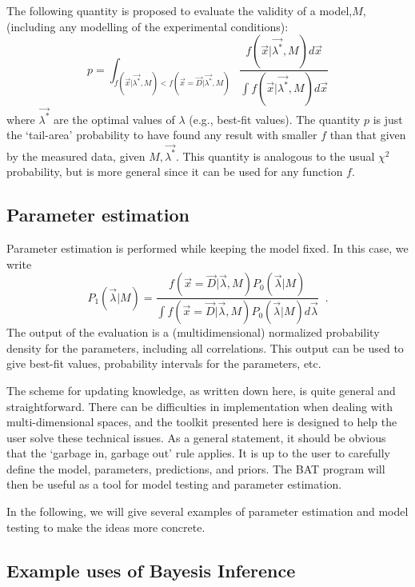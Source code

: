 \documentclass[11pt, a4paper]{article}
\begin{document}
The following quantity is proposed to evaluate the validity of a
model,$M$, (including any modelling of the experimental conditions):
%
\begin{equation}
p=\int_{f(\vec{x}|\vec{\lambda^*},M)<f(\vec{x}=\vec{D}|\vec{\lambda^*},M)} \frac{f(\vec{x}|\vec{\lambda^*},M) d\vec{x}}{\int f(\vec{x}|\vec{\lambda^*},M) d\vec{x}}
\end{equation}
%
where $\vec{\lambda^*}$ are the optimal values of $\lambda$ (e.g.,
best-fit values). The quantity $p$ is just the `tail-area' probability
to have found any result with smaller $f$ than that given by the
measured data, given $M,\vec{\lambda^*}$.  This quantity is analogous
to the usual $\chi^2$ probability, but is more general since it can be
used for any function $f$.

\subsection{Parameter estimation}
%
Parameter estimation is performed while keeping the model fixed.  In
this case, we write
%
\begin{equation}
P_{1}(\vec{\lambda}|M) =\frac{f(\vec{x}=\vec{D}|\vec{\lambda},M) P_{0}(\vec{\lambda}|M)}
{\int f(\vec{x}=\vec{D}|\vec{\lambda},M) P_{0}(\vec{\lambda}|M) d\vec{\lambda}} \;\; .
\label{eqn:BayesTheorem}
\end{equation}
%
The output of the evaluation is a (multidimensional) normalized
probability density for the parameters, including all correlations.
This output can be used to give best-fit values, probability intervals
for the parameters, etc.

The scheme for updating knowledge, as written down here, is quite
general and straightforward.  There can be difficulties in
implementation when dealing with multi-dimensional spaces, and the
toolkit presented here is designed to help the user solve these
technical issues.  As a general statement, it should be obvious that
the `garbage in, garbage out' rule applies.  It is up to the user to
carefully define the model, parameters, predictions, and priors.  The
BAT program will then be useful as a tool for model testing and
parameter estimation.

In the following, we will give several examples of parameter
estimation and model testing to make the ideas more concrete.


\subsection{Example uses of Bayesis Inference} 
\label{subsection:exampleuses} 
\end{document}
